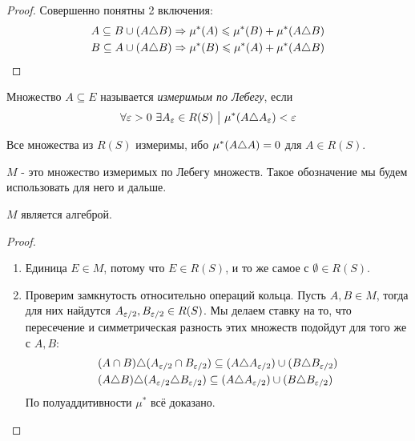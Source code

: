 \begin{proof}
	Совершенно понятны 2 включения:
	\begin{align*}
		&{A \subseteq B \cup (A \triangle B) \Rightarrow \mu^*(A) \leqslant \mu^*(B) + \mu^*(A \triangle B)}
		\\
		&{B \subseteq A \cup (A \triangle B) \Rightarrow \mu^*(B) \leqslant \mu^*(A) + \mu^*(A \triangle B)}
	\end{align*}
\end{proof}

\begin{definition}
	Множество $A \subseteq E$ называется \textit{измеримым по Лебегу}, если
	\[
		\forall \varepsilon > 0\ \exists A_{\varepsilon} \in R(S) \ \big|\  \mu^*(A \triangle A_{\varepsilon}) < \varepsilon
	\]
\end{definition}

\begin{note}
	Все множества из $R(S)$ измеримы, ибо $\mu^*(A \triangle A) = 0$ для $A \in R(S)$.
\end{note}

\begin{note}
	$M$ - это множество измеримых по Лебегу множеств. Такое обозначение мы будем использовать для него и дальше.
\end{note}

\begin{theorem}
	$M$ является алгеброй.
\end{theorem}

\begin{proof}~
	\begin{enumerate}
		\item Единица $E \in M$, потому что $E \in R(S)$, и то же самое с $\emptyset \in R(S)$.
		
		\item Проверим замкнутость относительно операций кольца. Пусть $A, B \in M$, тогда для них найдутся $A_{\varepsilon / 2}, B_{\varepsilon / 2} \in R(S)$. Мы делаем ставку на то, что пересечение и симметрическая разность этих множеств подойдут для того же с $A, B$:
		\begin{align*}
			&{(A \cap B) \triangle (A_{\varepsilon / 2} \cap B_{\varepsilon / 2}) \subseteq (A \triangle A_{\varepsilon / 2}) \cup (B \triangle B_{\varepsilon / 2})}
			\\
			&{(A \triangle B) \triangle (A_{\varepsilon / 2} \triangle B_{\varepsilon / 2}) \subseteq (A \triangle A_{\varepsilon / 2}) \cup (B \triangle B_{\varepsilon / 2})}
		\end{align*}
		По полуаддитивности $\mu^*$ всё доказано.
	\end{enumerate}
\end{proof}

